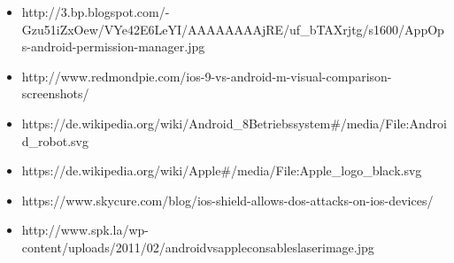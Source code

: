 \begin{frame}
\begin{itemize}
  \item{http://3.bp.blogspot.com/-Gzu51iZxOew/VYe42E6LeYI/AAAAAAAAjRE/uf_bTAXrjtg/s1600/AppOps-android-permission-manager.jpg}
  \item{http://www.redmondpie.com/ios-9-vs-android-m-visual-comparison-screenshots/}
  \item{https://de.wikipedia.org/wiki/Android_\28Betriebssystem#/media/File:Android_robot.svg}
  \item{https://de.wikipedia.org/wiki/Apple#/media/File:Apple_logo_black.svg}
  \item{https://www.skycure.com/blog/ios-shield-allows-dos-attacks-on-ios-devices/}
  \item{http://www.spk.la/wp-content/uploads/2011/02/androidvsappleconsableslaserimage.jpg}
\end{itemize}
\end{frame}
